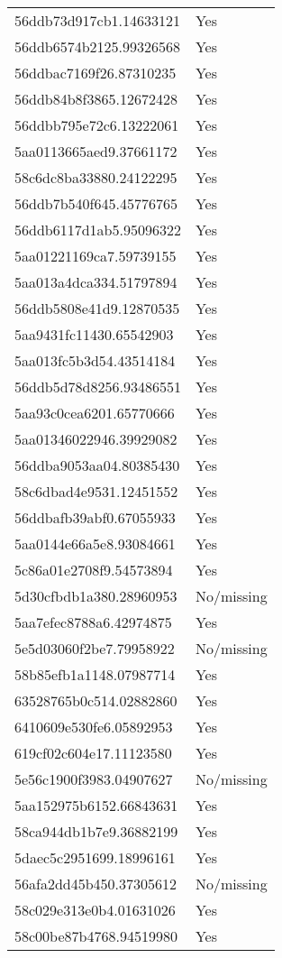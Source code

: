 \begin{tabular}{ll}
56ddb73d917cb1.14633121 & Yes \\
56ddb6574b2125.99326568 & Yes \\
56ddbac7169f26.87310235 & Yes \\
56ddb84b8f3865.12672428 & Yes \\
56ddbb795e72c6.13222061 & Yes \\
5aa0113665aed9.37661172 & Yes \\
58c6dc8ba33880.24122295 & Yes \\
56ddb7b540f645.45776765 & Yes \\
56ddb6117d1ab5.95096322 & Yes \\
5aa01221169ca7.59739155 & Yes \\
5aa013a4dca334.51797894 & Yes \\
56ddb5808e41d9.12870535 & Yes \\
5aa9431fc11430.65542903 & Yes \\
5aa013fc5b3d54.43514184 & Yes \\
56ddb5d78d8256.93486551 & Yes \\
5aa93c0cea6201.65770666 & Yes \\
5aa01346022946.39929082 & Yes \\
56ddba9053aa04.80385430 & Yes \\
58c6dbad4e9531.12451552 & Yes \\
56ddbafb39abf0.67055933 & Yes \\
5aa0144e66a5e8.93084661 & Yes \\
5c86a01e2708f9.54573894 & Yes \\
5d30cfbdb1a380.28960953 & No/missing \\
5aa7efec8788a6.42974875 & Yes \\
5e5d03060f2be7.79958922 & No/missing \\
58b85efb1a1148.07987714 & Yes \\
63528765b0c514.02882860 & Yes \\
6410609e530fe6.05892953 & Yes \\
619cf02c604e17.11123580 & Yes \\
5e56c1900f3983.04907627 & No/missing \\
5aa152975b6152.66843631 & Yes \\
58ca944db1b7e9.36882199 & Yes \\
5daec5c2951699.18996161 & Yes \\
56afa2dd45b450.37305612 & No/missing \\
58c029e313e0b4.01631026 & Yes \\
58c00be87b4768.94519980 & Yes \\

\end{tabular}
